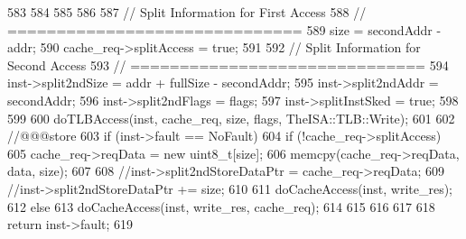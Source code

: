 \begin{DoxyCode}
{{{583         }
584         
585         
586 
587         // Split Information for First Access
588         // ==============================
589         size = secondAddr - addr;
590         cache_req->splitAccess = true;
591 
592         // Split Information for Second Access
593         // ==============================
594         inst->split2ndSize = addr + fullSize - secondAddr;
595         inst->split2ndAddr = secondAddr;            
596         inst->split2ndFlags = flags;        
597         inst->splitInstSked = true;
598     }    
599         
600     doTLBAccess(inst, cache_req, size, flags, TheISA::TLB::Write);
601 
602     //@@@store
603     if (inst->fault == NoFault) {
604         if (!cache_req->splitAccess) {
605             cache_req->reqData = new uint8_t[size];
606             memcpy(cache_req->reqData, data, size);
607 
608             //inst->split2ndStoreDataPtr = cache_req->reqData;
609             //inst->split2ndStoreDataPtr += size;
610 
611             doCacheAccess(inst, write_res);
612         } else {            
613             doCacheAccess(inst, write_res, cache_req);            
614         }        
615         
616     }
617     
618     return inst->fault;
619 }
\end{DoxyCode}


